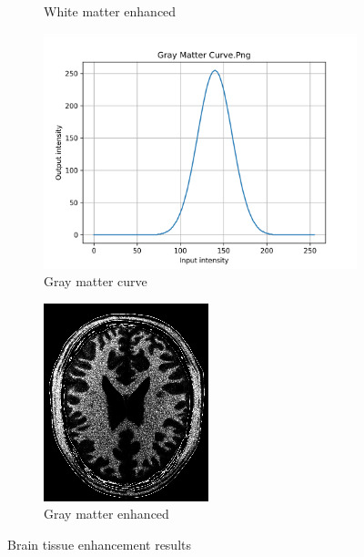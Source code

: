 \documentclass[10pt,a4paper]{article}
\begin{document}
\begin{figure}[H]
\begin{subfigure}{0.24\textwidth}
        \caption{White matter enhanced}
    \end{subfigure}
    \begin{subfigure}{0.24\textwidth}
        \includegraphics[width=\textwidth]{task2/gray_matter_curve.png}
        \caption{Gray matter curve}
    \end{subfigure}
    \begin{subfigure}{0.24\textwidth}
        \includegraphics[width=\textwidth]{task2/gray_matter.png}
        \caption{Gray matter enhanced}
    \end{subfigure}
    \caption{Brain tissue enhancement results}
\end{figure}
\end{document}
